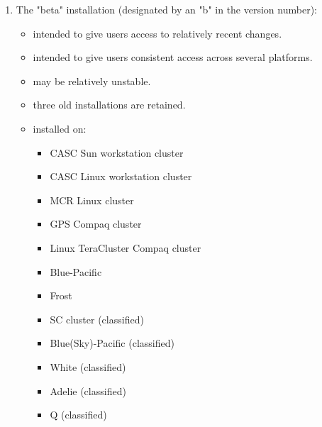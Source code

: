 \begin{enumerate}
\item The "beta" installation (designated by an "b" in the version number):
   \begin{itemize}
   \item intended to give users access to relatively recent changes.
   \item intended to give users consistent access across several platforms.
   \item may be relatively unstable.
   \item three old installations are retained.
   \item installed on:
      \begin{itemize}
       \item CASC Sun workstation cluster
       \item CASC Linux workstation cluster
       \item MCR Linux cluster
       \item GPS Compaq cluster
       \item Linux TeraCluster Compaq cluster
       \item Blue-Pacific
       \item Frost
       \item SC cluster          (classified)
       \item Blue(Sky)-Pacific   (classified)
       \item White               (classified)
       \item Adelie              (classified)
       \item Q                   (classified)
      \end{itemize}
   \end{itemize}


\end{enumerate}
